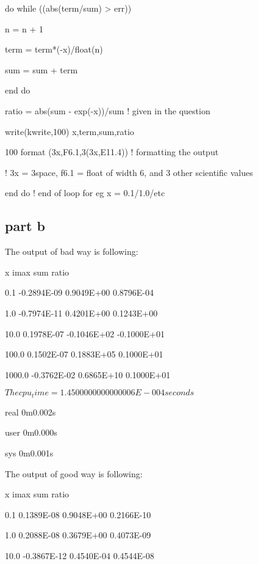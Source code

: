 \documentclass{article}
\begin{document}
        do while ((abs(term/sum) > err))
        
            n = n + 1
            
            term = term*(-x)/float(n) 
            
            sum = sum + term
            
        end do
        
        ratio = abs(sum - exp(-x))/sum ! given in the question
             
        write(kwrite,100) x,term,sum,ratio
        
        100 format (3x,F6.1,3(3x,E11.4)) ! formatting the output
        
        ! 3x = 3space, f6.1 = float of width 6, and 3 other scientific values
    
    end do ! end of loop for eg x = 0.1/1.0/etc




\subsection{part b}
The output of bad way is following:

   x       imax          sum           ratio    
   
      0.1   -0.2894E-09    0.9049E+00    0.8796E-04
      
      1.0   -0.7974E-11    0.4201E+00    0.1243E+00
      
     10.0    0.1978E-07   -0.1046E+02   -0.1000E+01
     
    100.0    0.1502E-07    0.1883E+05    0.1000E+01
    
   1000.0   -0.3762E-02    0.6865E+10    0.1000E+01
  
    $The cpu_time =   1.4500000000000006E-004 seconds$

real	0m0.002s

user	0m0.000s

sys	0m0.001s








The output of good way is following:


       x       imax          sum           ratio    

      0.1    0.1389E-08    0.9048E+00    0.2166E-10
      
      1.0    0.2088E-08    0.3679E+00    0.4073E-09
      
     10.0   -0.3867E-12    0.4540E-04    0.4544E-08
     
\end{document}
